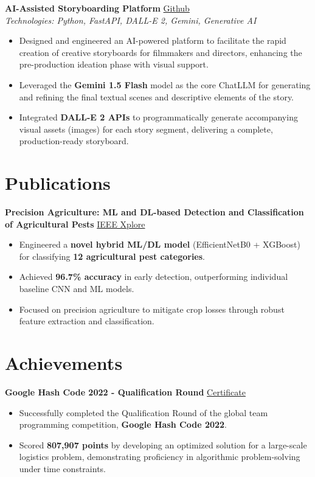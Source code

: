 \documentclass[a4paper,9pt]{extarticle}
\begin{document}
\textbf{AI-Assisted Storyboarding Platform} \hfill
\href{https://github.com/swoyam2609/aibot-backend}{Github}\\[3pt]
\textit{Technologies: Python, FastAPI, DALL-E 2, Gemini, Generative AI}
\begin{itemize}[leftmargin=*, labelsep=3pt, itemsep=2pt, topsep=2pt, parsep=0pt]
    \item Designed and engineered an AI-powered platform to facilitate the rapid creation of creative storyboards for filmmakers and directors, enhancing the pre-production ideation phase with visual support.
    \item Leveraged the \textbf{Gemini 1.5 Flash} model as the core ChatLLM for generating and refining the final textual scenes and descriptive elements of the story.
    \item Integrated \textbf{DALL-E 2 APIs} to programmatically generate accompanying visual assets (images) for each story segment, delivering a complete, production-ready storyboard.
\end{itemize}

\section*{Publications}
\textbf{Precision Agriculture: ML and DL-based Detection and Classification of Agricultural Pests} \hfill
\href{https://ieeexplore.ieee.org/abstract/document/10431427}{IEEE Xplore}
\begin{itemize}[leftmargin=*, labelsep=3pt, itemsep=2pt, topsep=2pt, parsep=0pt]
    \item Engineered a \textbf{novel hybrid ML/DL model} (EfficientNetB0 + XGBoost) for classifying \textbf{12 agricultural pest categories}.
    \item Achieved \textbf{96.7\% accuracy} in early detection, outperforming individual baseline CNN and ML models.
    \item Focused on precision agriculture to mitigate crop losses through robust feature extraction and classification.
\end{itemize}

\section*{Achievements}
\textbf{Google Hash Code 2022 - Qualification Round} \hfill
\href{https://www.linkedin.com/in/swoyam2609/overlay/1717313694757/single-media-viewer/?profileId=ACoAADTX3pABwhPYegclndc-1yAMXZUi1absYJw}{Certificate}
\begin{itemize}[leftmargin=*, labelsep=3pt, itemsep=2pt, topsep=2pt, parsep=0pt]
    \item Successfully completed the Qualification Round of the global team programming competition, \textbf{Google Hash Code 2022}.
    \item Scored \textbf{807,907 points} by developing an optimized solution for a large-scale logistics problem, demonstrating proficiency in algorithmic problem-solving under time constraints.
\end{itemize}
\end{document}
